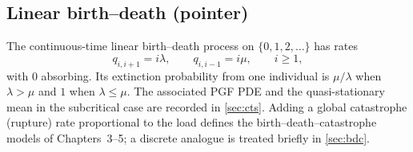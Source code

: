 \subsection{Linear birth--death (pointer)}
\label{sec:bd-pointer}

The continuous-time linear birth--death process on \(\{0,1,2,\dots\}\) has rates
\begin{equation}
\label{eq:bd-rates}
q_{i,i+1}=i\lambda,\qquad q_{i,i-1}=i\mu,\qquad i\ge1,
\end{equation}
with \(0\) absorbing. Its extinction probability from one individual is \(\mu/\lambda\) when \(\lambda>\mu\) and \(1\) when \(\lambda\le\mu\). The associated PGF PDE and the quasi-stationary mean in the subcritical case are recorded in \cref{sec:cts}. Adding a global catastrophe (rupture) rate proportional to the load defines the birth--death--catastrophe models of Chapters~3--5; a discrete analogue is treated briefly in \cref{sec:bdc}.
